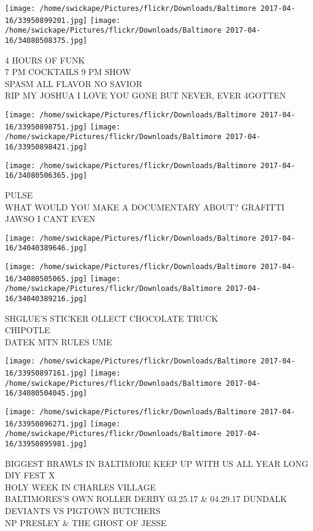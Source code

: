 \documentclass[10pt,letterpaper]{article}
\begin{document}
\texttt{[image: /home/swickape/Pictures/flickr/Downloads/Baltimore 2017-04-16/33950899201.jpg]}
\texttt{[image: /home/swickape/Pictures/flickr/Downloads/Baltimore 2017-04-16/34080508375.jpg]}

4 HOURS OF FUNK\\
7 PM COCKTAILS 9 PM SHOW\\
SPASM ALL FLAVOR NO SAVIOR\\
RIP MY JOSHUA I LOVE YOU GONE BUT NEVER, EVER 4GOTTEN\\
\pagebreak

\texttt{[image: /home/swickape/Pictures/flickr/Downloads/Baltimore 2017-04-16/33950898751.jpg]}
\texttt{[image: /home/swickape/Pictures/flickr/Downloads/Baltimore 2017-04-16/33950898421.jpg]}

\texttt{[image: /home/swickape/Pictures/flickr/Downloads/Baltimore 2017-04-16/34080506365.jpg]}

PULSE\\
WHAT WOULD YOU MAKE A DOCUMENTARY ABOUT?  GRAFITTI\\
JAWSO I CANT EVEN\\
\pagebreak

\texttt{[image: /home/swickape/Pictures/flickr/Downloads/Baltimore 2017-04-16/34040389646.jpg]}

\vspace{0.25in}
\texttt{[image: /home/swickape/Pictures/flickr/Downloads/Baltimore 2017-04-16/34080505065.jpg]}
\texttt{[image: /home/swickape/Pictures/flickr/Downloads/Baltimore 2017-04-16/34040389216.jpg]}

SHGLUE'S STICKER OLLECT CHOCOLATE TRUCK\\
CHIPOTLE\\
DATEK MTN RULES UME\\
\pagebreak

\texttt{[image: /home/swickape/Pictures/flickr/Downloads/Baltimore 2017-04-16/33950897161.jpg]}
\texttt{[image: /home/swickape/Pictures/flickr/Downloads/Baltimore 2017-04-16/34080504045.jpg]}

\texttt{[image: /home/swickape/Pictures/flickr/Downloads/Baltimore 2017-04-16/33950896271.jpg]}
\texttt{[image: /home/swickape/Pictures/flickr/Downloads/Baltimore 2017-04-16/33950895981.jpg]}

BIGGEST BRAWLS IN BALTIMORE KEEP UP WITH US ALL YEAR LONG DIY FEST X\\
HOLY WEEK IN CHARLES VILLAGE\\
BALTIMORES'S OWN ROLLER DERBY 03.25.17 \& 04.29.17 DUNDALK DEVIANTS VS PIGTOWN BUTCHERS\\
NP PRESLEY \& THE GHOST OF JESSE\\
\pagebreak
\end{document}
